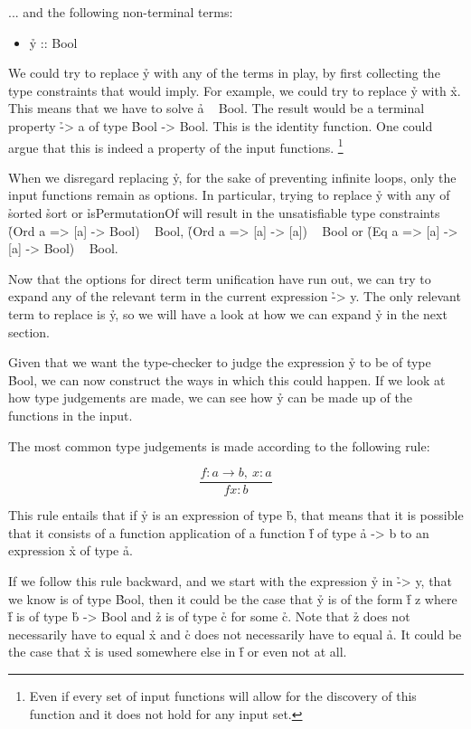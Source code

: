 \documentclass[a4paper, 11pt]{article}
\begin{document}
... and the following non-terminal terms:

\begin{itemize}
  \item \h{y :: Bool}
\end{itemize}

We could try to replace \h{y} with any of the terms in play, by first collecting the type constraints that would imply.
For example, we could try to replace \h{y} with \h{x}.
This means that we have to solve \h{a ~ Bool}.
The result would be a terminal property \h{\a -> a} of type \h{Bool -> Bool}.
This is the identity function.
One could argue that this is indeed a property of the input functions.
\footnote{Even if every set of input functions will allow for the discovery of this function and it does not hold for any input set.}

When we disregard replacing \h{y}, for the sake of preventing infinite loops, only the input functions remain as options.
In particular, trying to replace \h{y} with any of \h{sorted} \h{sort} or \h{isPermutationOf} will result in the unsatisfiable type constraints \h{(Ord a => [a] -> Bool) ~ Bool}, \h{(Ord a => [a] -> [a]) ~ Bool} or \h{(Eq a => [a] -> [a] -> Bool) ~ Bool}.

Now that the options for direct term unification have run out, we can try to expand any of the relevant term in the current expression \h{\x -> y}.
The only relevant term to replace is \h{y}, so we will have a look at how we can expand \h{y} in the next section.


Given that we want the type-checker to judge the expression \h{y} to be of type \h{Bool}, we can now construct the ways in which this could happen.
If we look at how type judgements are made, we can see how \h{y} can be made up of the functions in the input.

The most common type judgements is made according to the following rule:

\[
  \frac{f : a \rightarrow b,\ x : a}{f x : b}
\]

This rule entails that if \h{y} is an expression of type \h{b}, that means that it is possible that it consists of a function application of a function \h{f} of type \h{a -> b} to an expression \h{x} of type \h{a}.

If we follow this rule backward, and we start with the expression \h{y} in \h{\x -> y}, that we know is of type \h{Bool}, then it could be the case that \h{y} is of the form \h{f z} where \h{f} is of type \h{b -> Bool} and \h{z} is of type \h{c} for some \h{c}.
Note that \h{z} does not necessarily have to equal \h{x} and \h{c} does not necessarily have to equal \h{a}.
It could be the case that \h{x} is used somewhere else in \h{f} or even not at all.
\end{document}
